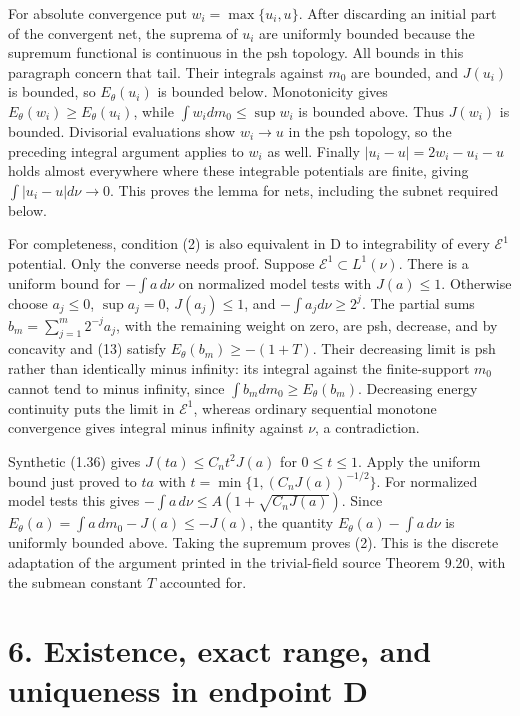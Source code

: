 \documentclass[11pt]{article}
\begin{document}
For absolute convergence put \(w_i=\max\{u_i,u\}\). After discarding an initial part of the convergent net, the suprema of \(u_i\) are uniformly bounded because the supremum functional is continuous in the psh topology. All bounds in this paragraph concern that tail. Their integrals against \(m_0\) are bounded, and \(J(u_i)\) is bounded, so \(E_\theta(u_i)\) is bounded below. Monotonicity gives \(E_\theta(w_i)\geq E_\theta(u_i)\), while \(\int w_i dm_0\leq\sup w_i\) is bounded above. Thus \(J(w_i)\) is bounded. Divisorial evaluations show \(w_i\to u\) in the psh topology, so the preceding integral argument applies to \(w_i\) as well. Finally \(|u_i-u|=2w_i-u_i-u\) holds almost everywhere where these integrable potentials are finite, giving \(\int|u_i-u|d\nu\to0\). This proves the lemma for nets, including the subnet required below.

For completeness, condition (2) is also equivalent in D to integrability of every \(\mathcal E^1\) potential. Only the converse needs proof. Suppose \(\mathcal E^1\subset L^1(\nu)\). There is a uniform bound for \(-\int a\,d\nu\) on normalized model tests with \(J(a)\leq1\). Otherwise choose \(a_j\leq0\), \(\sup a_j=0\), \(J(a_j)\leq1\), and \(-\int a_jd\nu\geq2^j\). The partial sums \(b_m=\sum_{j=1}^m2^{-j}a_j\), with the remaining weight on zero, are psh, decrease, and by concavity and (13) satisfy \(E_\theta(b_m)\geq-(1+T)\). Their decreasing limit is psh rather than identically minus infinity: its integral against the finite-support \(m_0\) cannot tend to minus infinity, since \(\int b_mdm_0\geq E_\theta(b_m)\). Decreasing energy continuity puts the limit in \(\mathcal E^1\), whereas ordinary sequential monotone convergence gives integral minus infinity against \(\nu\), a contradiction.

Synthetic (1.36) gives \(J(ta)\leq C_nt^2J(a)\) for \(0\leq t\leq1\). Apply the uniform bound just proved to \(ta\) with \(t=\min\{1,(C_nJ(a))^{-1/2}\}\). For normalized model tests this gives \(-\int a\,d\nu\leq A(1+\sqrt{C_nJ(a)})\). Since \(E_\theta(a)=\int a\,dm_0-J(a)\leq-J(a)\), the quantity \(E_\theta(a)-\int a\,d\nu\) is uniformly bounded above. Taking the supremum proves (2). This is the discrete adaptation of the argument printed in the trivial-field source Theorem 9.20, with the submean constant \(T\) accounted for.

\section*{6. Existence, exact range, and uniqueness in endpoint D}
\end{document}
